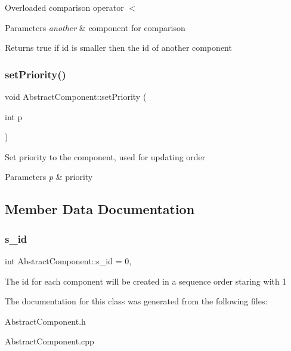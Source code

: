 Overloaded comparison operator \textquotesingle{}$<$\textquotesingle{}


\begin{DoxyParams}{Parameters}
{\em another} & component for comparison \\
\hline
\end{DoxyParams}
\begin{DoxyReturn}{Returns}
true if id is smaller then the id of another component 
\end{DoxyReturn}
\mbox{\label{class_abstract_component_a58a59a9ea6c3b4c86fb3bf98ff1eaaef}} 
\subsubsection{\texorpdfstring{set\+Priority()}{setPriority()}}
{\footnotesize\ttfamily void Abstract\+Component\+::set\+Priority (\begin{DoxyParamCaption}\item[{int}]{p }\end{DoxyParamCaption})\hspace{0.3cm}{\ttfamily [inline]}}

Set priority to the component, used for updating order


\begin{DoxyParams}{Parameters}
{\em p} & priority \\
\hline
\end{DoxyParams}


\subsection{Member Data Documentation}
\mbox{\label{class_abstract_component_a99ce3e5fe7d73dac569b874c15fcaf0d}} 
\subsubsection{\texorpdfstring{s\+\_\+id}{s\_id}}
{\footnotesize\ttfamily int Abstract\+Component\+::s\+\_\+id = 0\hspace{0.3cm}{\ttfamily [static]}, {\ttfamily [protected]}}

The id for each component will be created in a sequence order staring with 1 

The documentation for this class was generated from the following files\+:\begin{DoxyCompactItemize}
\item 
Abstract\+Component.\+h\item 
Abstract\+Component.\+cpp\end{DoxyCompactItemize}

